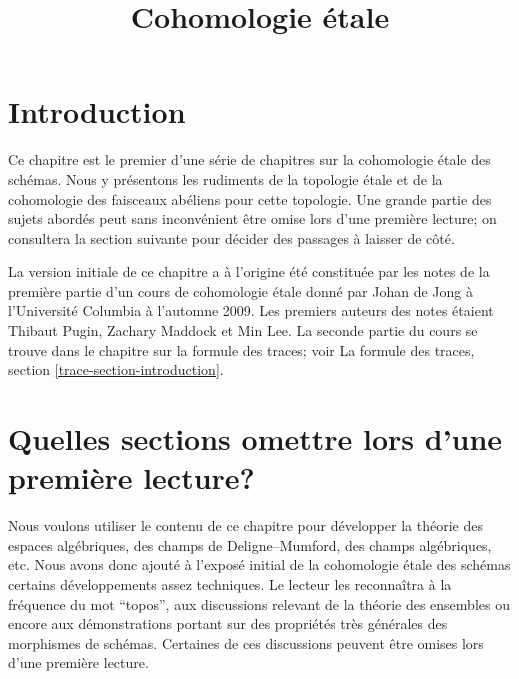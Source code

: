 

%


\title{Cohomologie \'etale}


\maketitle

\label{section-phantom}

\tableofcontents


\section{Introduction}
\label{section-introduction}

\noindent
Ce chapitre est le premier d'une s\'erie de chapitres sur la cohomologie
\'etale des sch\'emas. Nous y pr\'esentons les rudiments de la topologie
\'etale et de la cohomologie des faisceaux ab\'eliens pour cette topologie. Une
grande partie des sujets abord\'es peut sans inconv\'enient \^etre omise lors
d'une premi\`ere lecture; on consultera la section suivante pour d\'ecider des
passages \`a laisser de c\^ot\'e.

\medskip\noindent
La version initiale de ce chapitre a \`a l'origine \'et\'e constitu\'ee par les notes
de la premi\`ere partie d'un cours de cohomologie \'etale donn\'e par Johan de Jong
\`a l'Universit\'e Columbia \`a l'automne 2009. Les premiers auteurs des notes
\'etaient Thibaut Pugin, Zachary Maddock et Min Lee. La seconde partie du
cours se trouve dans le chapitre sur la formule des traces; voir
La formule des traces, section \ref{trace-section-introduction}.




\section{Quelles sections omettre lors d'une premi\`ere lecture?}
\label{section-skip}

\noindent
Nous voulons utiliser le contenu de ce chapitre pour d\'evelopper la th\'eorie
des espaces alg\'ebriques, des champs de Deligne--Mumford, des champs
alg\'ebriques, etc. Nous avons donc ajout\'e \`a l'expos\'e initial de la
cohomologie \'etale des sch\'emas certains d\'eveloppements assez techniques.
Le lecteur les reconna\^itra \`a la fr\'equence du mot ``topos'', aux discussions
relevant de la th\'eorie des ensembles ou encore aux d\'emonstrations portant
sur des propri\'et\'es tr\`es g\'en\'erales des morphismes de sch\'emas. Certaines de
ces discussions peuvent \^etre omises lors d'une premi\`ere lecture.

